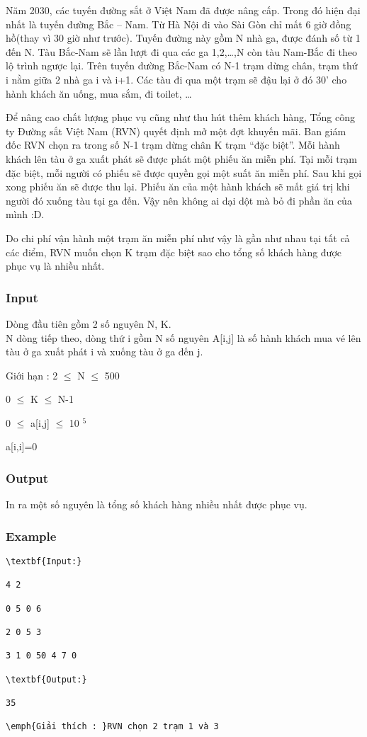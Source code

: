 



   Năm 2030, các tuyến đường sắt ở Việt Nam đã được nâng cấp. Trong đó hiện đại nhất là tuyến đường Bắc – Nam. Từ Hà Nội đi vào Sài Gòn chỉ mất 6 giờ đồng hồ(thay vì 30 giờ như trước). Tuyến đường này gồm N nhà ga, được đánh số từ 1 đến N. Tàu Bắc-Nam sẽ lần lượt đi qua các ga 1,2,…,N còn tàu Nam-Bắc đi theo lộ trình ngược lại. Trên tuyến đường Bắc-Nam có N-1 trạm dừng chân, trạm thứ i nằm giữa 2 nhà ga i và i+1. Các tàu đi qua một trạm sẽ đậu lại ở đó 30’ cho hành khách ăn uống, mua sắm, đi toilet, …  

   Để nâng cao chất lượng phục vụ cũng như thu hút thêm khách hàng, Tổng công ty Đường sắt Việt Nam (RVN) quyết định mở một đợt khuyến mãi. Ban giám đốc RVN chọn ra trong số N-1 trạm dừng chân K trạm “đặc biệt”. Mỗi hành khách lên tàu ở ga xuất phát sẽ được phát một phiếu ăn miễn phí. Tại mỗi trạm đặc biệt, mỗi người có phiếu sẽ được quyền gọi một suất ăn miễn phí. Sau khi gọi xong phiếu ăn sẽ được thu lại. Phiếu ăn của một hành khách sẽ mất giá trị khi người đó xuống tàu tại ga đến. Vậy nên không ai dại dột mà bỏ đi phần ăn của mình :D.  

   Do chi phí vận hành một trạm ăn miễn phí như vậy là gần như nhau tại tất cả các điểm, RVN muốn chọn K trạm đặc biệt sao cho tổng số khách hàng được phục vụ là nhiều nhất.  

\subsubsection{   Input  }

   Dòng đầu tiên gồm 2 số nguyên N, K.   
\\   N dòng tiếp theo, dòng thứ i gồm N số nguyên A[i,j] là số hành khách mua vé lên tàu ở ga xuất phát i và xuống tàu ở ga đến j.  

\emph{}    Giới hạn :      2  $\le$  N  $\le$  500  

   0  $\le$  K  $\le$  N-1  

   0  $\le$  a[i,j]  $\le$  10   $^    5   $

   a[i,i]=0  

\subsubsection{   Output  }

   In ra một số nguyên là tổng số khách hàng nhiều nhất được phục vụ.  

\subsubsection{   Example  }
\begin{verbatim}
\textbf{Input:}

4 2

0 5 0 6

2 0 5 3

3 1 0 50 4 7 0

\textbf{Output:}

35

\emph{Giải thích : }RVN chọn 2 trạm 1 và 3\end{verbatim}
